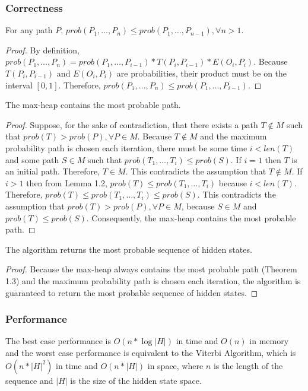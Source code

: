 \documentclass[../main.tex]{subfiles}
\begin{document}
\subsubsection{Correctness}
\begin{lemma}
For any path $P$, $prob(P_1, \ldots, P_{n}) \le prob(P_1, \ldots, P_{n-1}), \forall n > 1$.
\end{lemma}
\begin{proof}
By definition, $prob(P_1, \ldots, P_{n}) = prob(P_1, \ldots, P_{i-1}) * T(P_i, P_{i-1}) * E(O_i, P_i)$. Because $T(P_i, P_{i-1})$ and $E(O_i, P_i)$ are probabilities, their product must be on the interval $[0, 1]$. Therefore, $prob(P_1, \ldots, P_{n}) \le prob(P_1, \ldots, P_{i-1})$.
\end{proof}

\begin{theorem}
The max-heap contains the most probable path.
\end{theorem}
\begin{proof}
Suppose, for the sake of contradiction, that there exists a path $T \not\in M$ such that $prob(T) > prob(P), \forall P \in M$. Because $T \not\in M$ and the maximum probability path is chosen each iteration, there must be some time $i < len(T)$ and some path $S \in M$ such that $prob(T_1, \ldots, T_i) \le prob(S)$. If $i = 1$ then $T$ is an initial path. Therefore, $T \in M$. This contradicts the assumption that $T \not\in M$. If $i > 1$ then from Lemma 1.2, $prob(T) \le prob(T_1, \ldots, T_i)$ because $i < len(T)$. Therefore, $prob(T) \le prob(T_1, \ldots, T_i) \le prob(S)$. This contradicts the assumption that $prob(T) > prob(P), \forall P \in M$, because $S \in M$ and $prob(T) \le prob(S)$. Consequently, the max-heap contains the most probable path.
\end{proof}

\begin{theorem}
The algorithm returns the most probable sequence of hidden states.
\end{theorem}
\begin{proof}
Because the max-heap always contains the most probable path (Theorem 1.3) and the maximum probability path is chosen each iteration, the algorithm is guaranteed to return the most probable sequence of hidden states.
\end{proof}

\subsubsection{Performance}
The best case performance is $O(n * \log{|H|})$ in time and $O(n)$ in memory and the worst case performance is equivalent to the Viterbi Algorithm, which is $O(n * |H|^2)$ in time and $O(n * |H|)$ in space, where $n$ is the length of the sequence and $|H|$ is the size of the hidden state space.
\end{document}
